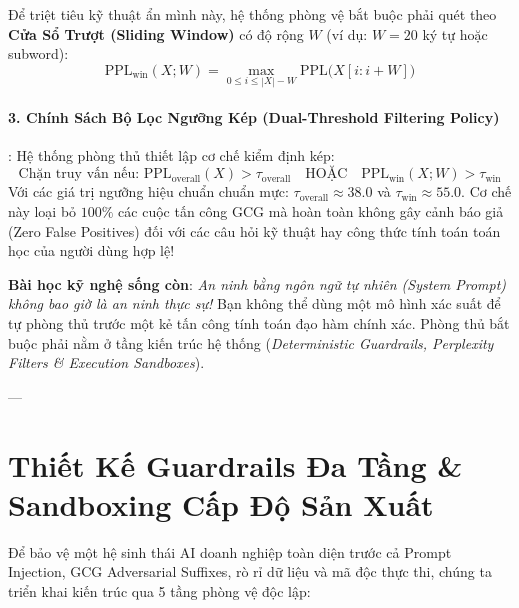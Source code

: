 Để triệt tiêu kỹ thuật ẩn mình này, hệ thống phòng vệ bắt buộc phải quét theo \textbf{Cửa Sổ Trượt (Sliding Window)} có độ rộng $W$ (ví dụ: $W = 20$ ký tự hoặc subword):
\begin{equation}
\text{PPL}_{\text{win}}(X; W) = \max_{0 \le i \le |X|-W} \text{PPL}\big( X[i : i+W] \big)
\label{eq:sliding-window-ppl}
\end{equation}

\paragraph{3. Chính Sách Bộ Lọc Ngưỡng Kép (Dual-Threshold Filtering Policy)}:
Hệ thống phòng thủ thiết lập cơ chế kiểm định kép:
\begin{equation}
\text{Chặn truy vấn nếu: } \text{PPL}_{\text{overall}}(X) > \tau_{\text{overall}} \quad \text{HOẶC} \quad \text{PPL}_{\text{win}}(X; W) > \tau_{\text{win}}
\end{equation}
Với các giá trị ngưỡng hiệu chuẩn chuẩn mực: $\tau_{\text{overall}} \approx 38.0$ và $\tau_{\text{win}} \approx 55.0$. Cơ chế này loại bỏ $100\%$ các cuộc tấn công GCG mà hoàn toàn không gây cảnh báo giả (Zero False Positives) đối với các câu hỏi kỹ thuật hay công thức tính toán toán học của người dùng hợp lệ!

\textbf{Bài học kỹ nghệ sống còn}: \textit{An ninh bằng ngôn ngữ tự nhiên (System Prompt) không bao giờ là an ninh thực sự!} Bạn không thể dùng một mô hình xác suất để tự phòng thủ trước một kẻ tấn công tính toán đạo hàm chính xác. Phòng thủ bắt buộc phải nằm ở tầng kiến trúc hệ thống (\textit{Deterministic Guardrails, Perplexity Filters \& Execution Sandboxes}).

---

\section{Thiết Kế Guardrails Đa Tầng \& Sandboxing Cấp Độ Sản Xuất}
\label{sec:ch12-defense-in-depth}

Để bảo vệ một hệ sinh thái AI doanh nghiệp toàn diện trước cả Prompt Injection, GCG Adversarial Suffixes, rò rỉ dữ liệu và mã độc thực thi, chúng ta triển khai kiến trúc  qua 5 tầng phòng vệ độc lập:

